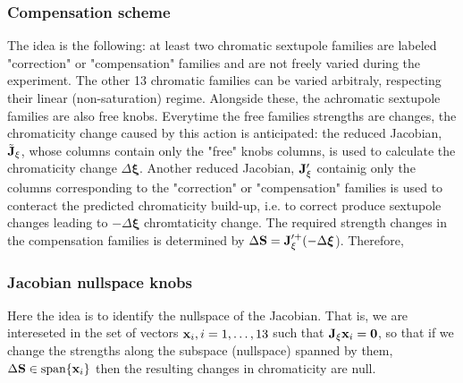 \subsubsection{Compensation scheme}
The idea is the following: at least two chromatic sextupole families are labeled "correction" or "compensation" families and are not freely varied during the experiment. The other 13 chromatic families can be varied arbitraly, respecting their linear (non-saturation) regime. Alongside these, the achromatic sextupole families are also free knobs. Everytime the free families strengths are changes, the chromaticity change caused by this action is anticipated: the reduced Jacobian, $\tilde{\vb{J}}_\xi$, whose columns contain only the "free" knobs columns, is used to calculate the chromaticity change $\Delta \boldsymbol{\xi}$. Another reduced Jacobian, $\vb{J}_{\xi}^{\prime}$ containig only the columns corresponding to the "correction" or "compensation" families is used to conteract the predicted chromaticity build-up, i.e. to correct produce sextupole changes leading to $-\Delta \boldsymbol{\xi}$ chromtaticity change. The required strength changes in the compensation families is determined by $\Delta \vb{S} = \vb{J}_{\xi}^{\prime +}(-\Delta \boldsymbol{\xi}$). Therefore,

\subsubsection{Jacobian nullspace knobs}
Here the idea is to identify the nullspace of the Jacobian. That is, we are intereseted in the set of vectors $\vb{x}_i, i=1,\dots,13$ such that $\vb{J}_{\xi} \vb{x}_i = \vb{0}$, so that if we change the strengths along the subspace (nullspace) spanned by them, $\Delta \vb{S}\in\text{span}\{\vb{x}_i\}$ then the resulting changes in chromaticity are null.


